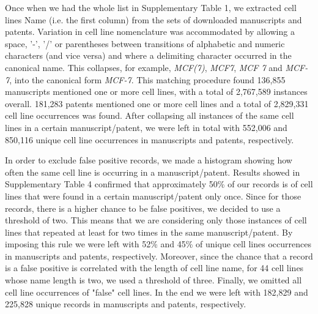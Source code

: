 \documentclass[10pt]{article}
\begin{document}
Once when we had the whole list in Supplementary Table 1, we extracted cell lines Name (i.e. the first column) from the sets of downloaded manuscripts and patents. Variation in cell line nomenclature was accommodated by allowing a space, '-', '/' or parentheses between transitions of alphabetic and numeric characters (and vice versa) and where a delimiting character occurred in the canonical name. This collapses, for example, \textit{MCF(7)}, \textit{MCF7}, \textit{MCF 7} and \textit{MCF-7}, into the canonical form \textit{MCF-7}. This matching procedure found 136,855 manuscripts mentioned one or more cell lines, with a total of 2,767,589 instances overall. 181,283 patents mentioned one or more cell lines and a total of 2,829,331 cell line occurrences was found. After collapsing all instances of the same cell lines in a certain manuscript/patent, we were left in total with 552,006 and 850,116 unique cell line occurrences in manuscripts and patents, respectively. 

In order to exclude false positive records, we made a histogram showing how often the same cell line is occurring in a manuscript/patent. Results showed in Supplementary Table 4 confirmed that approximately 50\% of our records is of cell lines that were found in a certain manuscript/patent only once. Since for those records, there is a higher chance to be false positives, we decided to use a threshold of two. This means that we are considering only those instances of cell lines that repeated at least for two times in the same manuscript/patent. By imposing this rule we were left with 52\% and 45\% of unique cell lines occurrences in manuscripts and patents, respectively. Moreover, since the chance that a record is a false positive is correlated with the length of cell line name, for 44 cell lines whose name length is two, we used a threshold of three. Finally, we omitted all cell line occurrences of "false" cell lines. In the end we were left with 182,829 and 225,828 unique records in manuscripts and patents, respectively.
\end{document}
